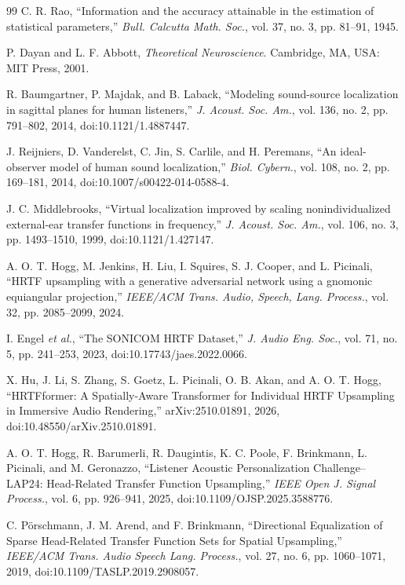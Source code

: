 \documentclass[journal]{IEEEtran}
\begin{document}
\begin{thebibliography}{99}
C. R. Rao, ``Information and the accuracy attainable in the estimation of statistical parameters,'' \textit{Bull. Calcutta Math. Soc.}, vol. 37, no. 3, pp. 81--91, 1945.

P. Dayan and L. F. Abbott, \textit{Theoretical Neuroscience}. Cambridge, MA, USA: MIT Press, 2001.

R. Baumgartner, P. Majdak, and B. Laback, ``Modeling sound-source localization in sagittal planes for human listeners,'' \textit{J. Acoust. Soc. Am.}, vol. 136, no. 2, pp. 791--802, 2014, doi:10.1121/1.4887447.

J. Reijniers, D. Vanderelst, C. Jin, S. Carlile, and H. Peremans,
``An ideal-observer model of human sound localization,''
\textit{Biol. Cybern.}, vol. 108, no. 2, pp. 169--181, 2014, doi:10.1007/s00422-014-0588-4.

J. C. Middlebrooks, ``Virtual localization improved by scaling nonindividualized external-ear transfer functions in frequency,'' \textit{J. Acoust. Soc. Am.}, vol. 106, no. 3, pp. 1493--1510, 1999, doi:10.1121/1.427147.

A. O. T. Hogg, M. Jenkins, H. Liu, I. Squires, S. J. Cooper, and L. Picinali,
``HRTF upsampling with a generative adversarial network using a gnomonic equiangular projection,''
\textit{IEEE/ACM Trans. Audio, Speech, Lang. Process.}, vol. 32, pp. 2085--2099, 2024.

I. Engel \textit{et al.}, ``The SONICOM HRTF Dataset,'' \textit{J. Audio Eng. Soc.}, vol. 71, no. 5, pp. 241--253, 2023, doi:10.17743/jaes.2022.0066.

X. Hu, J. Li, S. Zhang, S. Goetz, L. Picinali, O. B. Akan, and A. O. T. Hogg,
``HRTFformer: A Spatially-Aware Transformer for Individual HRTF Upsampling in Immersive Audio Rendering,''
arXiv:2510.01891, 2026, doi:10.48550/arXiv.2510.01891.

A. O. T. Hogg, R. Barumerli, R. Daugintis, K. C. Poole, F. Brinkmann, L. Picinali, and M. Geronazzo,
``Listener Acoustic Personalization Challenge--LAP24: Head-Related Transfer Function Upsampling,''
\textit{IEEE Open J. Signal Process.}, vol. 6, pp. 926--941, 2025, doi:10.1109/OJSP.2025.3588776.

C. P\"orschmann, J. M. Arend, and F. Brinkmann, ``Directional Equalization of Sparse Head-Related Transfer Function Sets for Spatial Upsampling,'' \textit{IEEE/ACM Trans. Audio Speech Lang. Process.}, vol. 27, no. 6, pp. 1060--1071, 2019, doi:10.1109/TASLP.2019.2908057.


\end{thebibliography}
\end{document}
